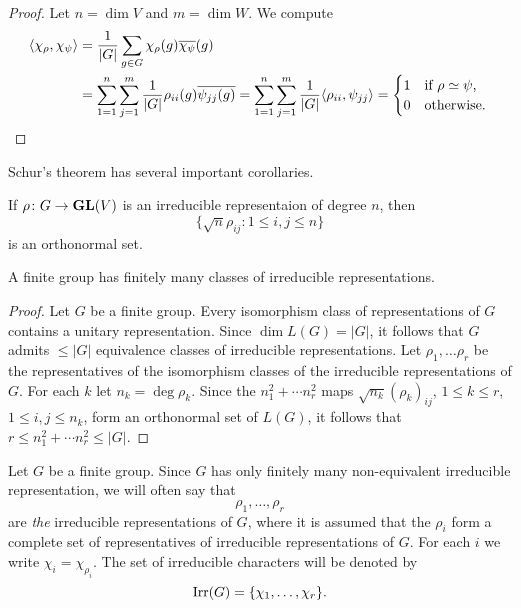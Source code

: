 \begin{proof}
    Let $n=\dim V$ and $m=\dim W$. We compute
    \begin{align*}
        \langle\chi_\rho,\chi_\psi\rangle
        &=\frac{1}{|G|}\sum_{g\in G}\chi_\rho(g)\overline{\chi_\psi}(g)\\
        &=\sum_{1=1}^n\sum_{j=1}^m\frac{1}{|G|}\rho_{ii}(g)\overline{\psi_{jj}(g)}
        =\sum_{1=1}^n\sum_{j=1}^m\frac{1}{|G|}\langle \rho_{ii},\psi_{jj}\rangle
        =\begin{cases}
            1 & \text{if $\rho\simeq\psi$,}\\
            0 & \text{otherwise.}
        \end{cases}\qedhere
    \end{align*}
\end{proof}

Schur's theorem has several important corollaries.

If $\rho\colon G\to\mathbf{GL}(V)$ is an irreducible representaion of degree $n$, then
\[
\{\sqrt{n}\rho_{ij}:1\leq i,j\leq n\}
\]
is an orthonormal set.


\begin{corollary}
    A finite group has finitely many classes of irreducible representations. 
\end{corollary}

\begin{proof}
    Let $G$ be a finite group. 
    Every isomorphism class of representations of $G$ contains a unitary representation. Since $\dim L(G)=|G|$, 
    it follows that $G$ admits $\leq|G|$ equivalence classes of irreducible representations. Let
    $\rho_1,\dots\rho_r$ be the representatives of the isomorphism classes of the 
    irreducible representations of $G$. For each $k$ let $n_k=\deg\rho_k$. Since
    the $n_1^2+\cdots n_r^2$ maps $\sqrt{n_k}(\rho_k)_{ij}$, $1\leq k\leq r$, $1\leq i,j\leq n_k$,
    form an orthonormal set of $L(G)$, it follows that
    $r\leq n_1^2+\cdots n_r^2\leq|G|$.
\end{proof}

Let $G$ be a finite group. Since $G$ has only finitely many non-equivalent 
irreducible representation, we will often say
that 
\[
\rho_1,\dots,\rho_r
\]
are \emph{the} irreducible representations of $G$, where it is assumed that
the $\rho_i$ form a complete set of 
representatives of irreducible representations of $G$. For each $i$ we write
$\chi_i=\chi_{\rho_i}$. The set of irreducible characters will be denoted
by 
\[
\operatorname{Irr}(G)=\{\chi_1,\dots,\chi_r\}.
\]

